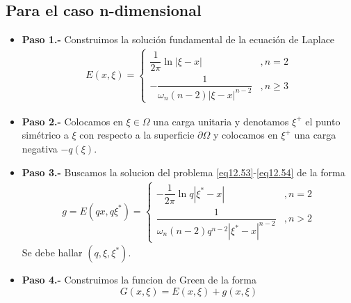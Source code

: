 \documentclass[../main]{subfiles}
\begin{document}
    \subsection*{Para el caso n-dimensional}
    \begin{itemize}
        \item[] \textbf{Paso 1.-} Construimos la solución fundamental de la ecuación de Laplace
        \begin{equation}
        \begin{split}
            E(x, \xi)=
            \left\{
            \begin{array}{cc}
              \displaystyle \dfrac{1}{2\pi}\ln{|\xi-x|}   & ,n=2 \\
              \displaystyle -\dfrac{1}{\omega_n(n-2)|\xi-x|^{n-2}}   & ,n\geq 3
            \end{array}
            \right.
        \end{split}
        \end{equation}
    \item[] \textbf{Paso 2.-} Colocamos en $\xi \in \Omega$ una carga unitaria y denotamos $\xi^+$ el punto simétrico a $\xi$ con respecto a la superficie $\partial\Omega$ y colocamos en $\xi^+$ una carga negativa $-q(\xi)$.
    \item[] \textbf{Paso 3.-} Buscamos la solucion del problema \eqref{eq12.53}-\eqref{eq12.54} de la forma
    \begin{equation}
        \begin{split}
            g=E(qx, q\xi^*)=
            \left\{
            \begin{array}{cc}
              \displaystyle -\dfrac{1}{2\pi}\ln{q|\xi^*-x|}   & ,n=2 \\
              \displaystyle \dfrac{1}{\omega_n(n-2)q^{n-2}|\xi^*-x|^{n-2}}   & ,n>2
            \end{array}
            \right.
        \end{split}
    \end{equation}
    Se debe hallar $(q,\xi,\xi^*)$.
    \item[] \textbf{Paso 4.-} Construimos la funcion de Green de la forma
    \begin{equation}
        G(x,\xi)=E(x,\xi)+g(x,\xi)
    \end{equation}
    \end{itemize}
\end{document}
